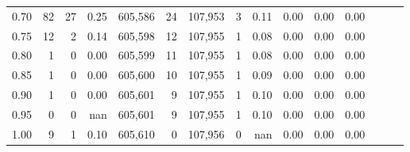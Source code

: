 \begin{tabular}{rrrrrrrrrrrrrrr}
0.70 &       82 &      27 &  0.25 &  605,586 &       24 &  107,953 &        3 &  0.11 &  0.00 &  0.00 &      0.00 \\
0.75 &       12 &       2 &  0.14 &  605,598 &       12 &  107,955 &        1 &  0.08 &  0.00 &  0.00 &      0.00 \\
0.80 &        1 &       0 &  0.00 &  605,599 &       11 &  107,955 &        1 &  0.08 &  0.00 &  0.00 &      0.00 \\
0.85 &        1 &       0 &  0.00 &  605,600 &       10 &  107,955 &        1 &  0.09 &  0.00 &  0.00 &      0.00 \\
0.90 &        1 &       0 &  0.00 &  605,601 &        9 &  107,955 &        1 &  0.10 &  0.00 &  0.00 &      0.00 \\
0.95 &        0 &       0 &   nan &  605,601 &        9 &  107,955 &        1 &  0.10 &  0.00 &  0.00 &      0.00 \\
1.00 &        9 &       1 &  0.10 &  605,610 &        0 &  107,956 &        0 &   nan &  0.00 &  0.00 &      0.00 \\
\bottomrule
\end{tabular}
